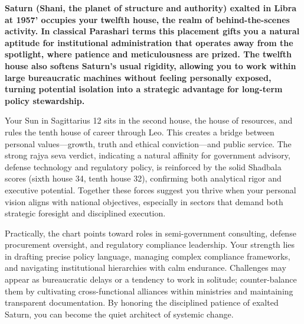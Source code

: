 
\label{topic44}

{\fontsize{9.5}{13.8}\selectfont\bfseries\color{DeepSlate} Saturn (Shani, the planet of structure and authority) exalted in Libra at 19\textdegree{}57' occupies your twelfth house, the realm of behind-the-scenes activity. In classical Parashari terms this placement gifts you a natural aptitude for institutional administration that operates away from the spotlight, where patience and meticulousness are prized. The twelfth house also softens Saturn's usual rigidity, allowing you to work within large bureaucratic machines without feeling personally exposed, turning potential isolation into a strategic advantage for long-term policy stewardship.}\par\vspace{2mm}

{\fontsize{9}{13}\selectfont Your Sun in Sagittarius 12\textdegree{} sits in the second house, the house of resources, and rules the tenth house of career through Leo. This creates a bridge between personal values---growth, truth and ethical conviction---and public service. The strong rajya seva verdict, indicating a natural affinity for government advisory, defense technology and regulatory policy, is reinforced by the solid Shadbala scores (sixth house 34, tenth house 32), confirming both analytical rigor and executive potential. Together these forces suggest you thrive when your personal vision aligns with national objectives, especially in sectors that demand both strategic foresight and disciplined execution.}\par\vspace{1.8mm}

{\fontsize{9}{13}\selectfont Practically, the chart points toward roles in semi-government consulting, defense procurement oversight, and regulatory compliance leadership. Your strength lies in drafting precise policy language, managing complex compliance frameworks, and navigating institutional hierarchies with calm endurance. Challenges may appear as bureaucratic delays or a tendency to work in solitude; counter-balance them by cultivating cross-functional alliances within ministries and maintaining transparent documentation. By honoring the disciplined patience of exalted Saturn, you can become the quiet architect of systemic change.}\par\vspace{1.8mm}

